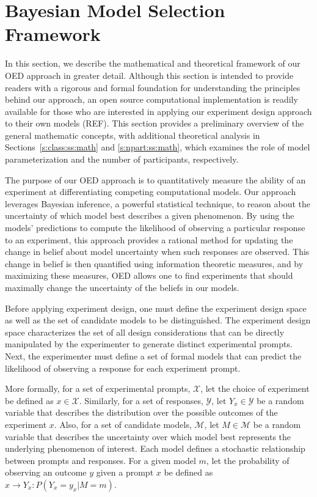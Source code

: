 \documentclass[11pt]{article}
\begin{document}
\section{Bayesian Model Selection Framework}
\label{s:bayes}

In this section, we describe the mathematical and theoretical framework of our OED approach in greater detail. Although this section is intended to provide readers with a rigorous and formal foundation for understanding the principles behind our approach, an open source computational implementation is readily available for those who are interested in applying our experiment design approach to their own models (REF). This section provides a preliminary overview of the general mathematic concepts, with additional theoretical analysis in Sections~\ref{s:class:ss:math} and \ref{s:npart:ss:math}, which examines the role of model parameterization and the number of participants, respectively.

The purpose of our OED approach is to quantitatively measure the ability of an experiment at differentiating competing computational models. Our approach leverages Bayesian inference, a powerful statistical technique, to reason about the uncertainty of which model best describes a given phenomenon. By using the models' predictions to compute the likelihood of observing a particular response to an experiment, this approach provides a rational method for updating the change in belief about model uncertainty when such responses are observed. This change in belief is then quantified using information theoretic measures, and by maximizing these measures, OED allows one to find experiments that should maximally change the uncertainty of the beliefs in our models. 

Before applying experiment design, one must define the experiment design space as well as the set of candidate models to be distinguished. The experiment design space characterizes the set of all design considerations that can be directly manipulated by the experimenter to generate distinct experimental prompts. Next, the experimenter must define a set of formal models that can predict the likelihood of observing a response for each experiment prompt. 

More formally, for a set of experimental prompts, $\mathcal{X}$, let the choice of experiment be defined as $x \in \mathcal{X}$. Similarly, for a set of responses, $\mathcal{Y}$, let $Y_x \in \mathcal{Y}$ be a random variable that describes the distribution over the possible outcomes of the experiment $x$. Also, for a set of candidate models, $\mathcal{M}$, let $M \in \mathcal{M}$ be a random variable that describes the uncertainty over which model best represents the underlying phenomenon of interest. Each model defines a stochastic relationship between prompts and responses. For a given model $m$, let the probability of observing an outcome $y$ given a prompt $x$ be defined as $x \rightarrow Y_x: P(Y_x = y_x | M = m)$.
\end{document}
